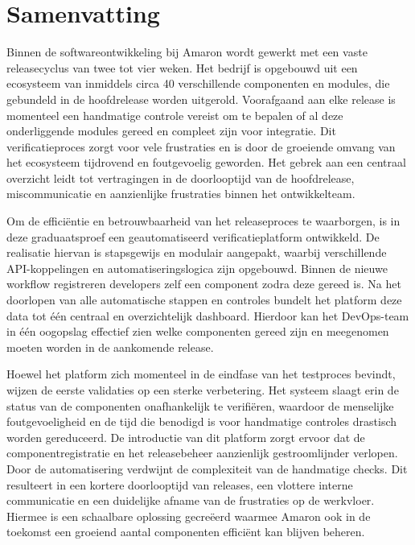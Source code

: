 \chapter*{Samenvatting}

Binnen de softwareontwikkeling bij Amaron wordt gewerkt met een vaste releasecyclus van twee tot vier weken. Het bedrijf is opgebouwd uit een ecosysteem van inmiddels circa 40 verschillende componenten en modules, die gebundeld in de hoofdrelease worden uitgerold. Voorafgaand aan elke release is momenteel een handmatige controle vereist om te bepalen of al deze onderliggende modules gereed en compleet zijn voor integratie. Dit verificatieproces zorgt voor vele frustraties en is door de groeiende omvang van het ecosysteem tijdrovend en foutgevoelig geworden. Het gebrek aan een centraal overzicht leidt tot vertragingen in de doorlooptijd van de hoofdrelease, miscommunicatie en aanzienlijke frustraties binnen het ontwikkelteam.

Om de efficiëntie en betrouwbaarheid van het releaseproces te waarborgen, is in deze graduaatsproef een geautomatiseerd verificatieplatform ontwikkeld. De realisatie hiervan is stapsgewijs en modulair aangepakt, waarbij verschillende API-koppelingen en automatiseringslogica zijn opgebouwd. Binnen de nieuwe workflow registreren developers zelf een component zodra deze gereed is. Na het doorlopen van alle automatische stappen en controles bundelt het platform deze data tot één centraal en overzichtelijk dashboard. Hierdoor kan het DevOps-team in één oogopslag effectief zien welke componenten gereed zijn en meegenomen moeten worden in de aankomende release.

Hoewel het platform zich momenteel in de eindfase van het testproces bevindt, wijzen de eerste validaties op een sterke verbetering. Het systeem slaagt erin de status van de componenten onafhankelijk te verifiëren, waardoor de menselijke foutgevoeligheid en de tijd die benodigd is voor handmatige controles drastisch worden gereduceerd. De introductie van dit platform zorgt ervoor dat de componentregistratie en het releasebeheer aanzienlijk gestroomlijnder verlopen. Door de automatisering verdwijnt de complexiteit van de handmatige checks. Dit resulteert in een kortere doorlooptijd van releases, een vlottere interne communicatie en een duidelijke afname van de frustraties op de werkvloer. Hiermee is een schaalbare oplossing gecreëerd waarmee Amaron ook in de toekomst een groeiend aantal componenten efficiënt kan blijven beheren.

